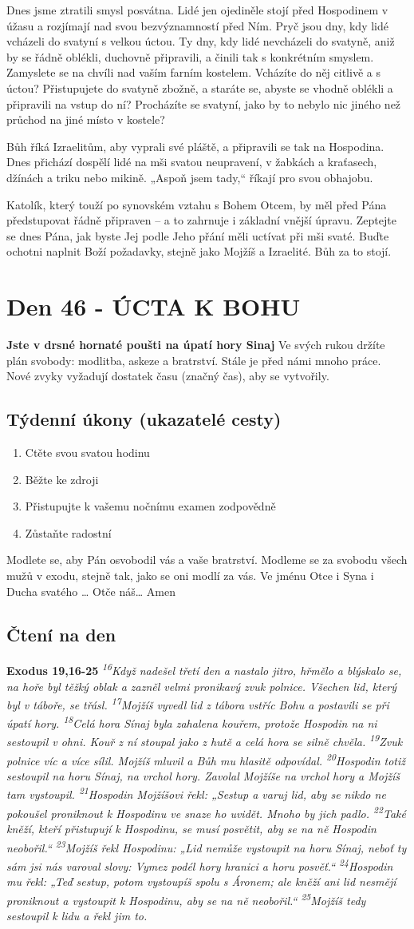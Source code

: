 \documentclass[11pt]{article}
\newcommand{\zacatekSedmyTyden}{
  \textbf{Jste v drsné hornaté poušti na úpatí hory Sinaj} \newline 
  Ve svých rukou držíte plán svobody: modlitba, askeze a bratrství. Stále je před námi mnoho práce. Nové zvyky vyžadují dostatek času (značný čas), aby se vytvořily.

  \subsection*{Týdenní úkony (ukazatelé cesty)}
\begin{enumerate}
  \item Ctěte svou svatou hodinu
  \item Běžte ke zdroji
  \item Přistupujte k vašemu nočnímu examen zodpovědně
  \item Zůstaňte radostní
\end{enumerate}
Modlete se, aby Pán osvobodil vás a vaše bratrství. \newline
Modleme se za svobodu všech mužů v exodu, stejně tak, jako se oni modlí za vás.\newline
Ve jménu Otce i Syna i Ducha svatého …  Otče náš… Amen
}
\begin{document}
Dnes jsme ztratili smysl posvátna. Lidé jen ojediněle stojí před Hospodinem v úžasu a rozjímají nad svou
bezvýznamností před Ním. Pryč jsou dny, kdy lidé vcházeli do svatyní s velkou úctou. Ty dny, kdy lidé nevcházeli do
svatyně, aniž by se řádně oblékli, duchovně připravili, a činili tak s konkrétním smyslem. Zamyslete se na chvíli nad
vaším farním kostelem. Vcházíte do něj citlivě a s úctou? Přistupujete do svatyně zbožně, a staráte se, abyste se vhodně
oblékli a připravili na vstup do ní? Procházíte se svatyní, jako by to nebylo nic jiného než průchod na jiné místo v kostele?

Bůh říká Izraelitům, aby vyprali své pláště, a připravili se tak na Hospodina. Dnes přichází dospělí lidé na mši svatou
neupravení, v žabkách a kraťasech, džínách a triku nebo mikině. „Aspoň jsem tady,“ říkají pro svou obhajobu.

Katolík, který touží po synovském vztahu s Bohem Otcem, by měl před Pána předstupovat řádně připraven – a to zahrnuje
i základní vnější úpravu. Zeptejte se dnes Pána, jak byste Jej podle Jeho přání měli uctívat při mši svaté. Buďte ochotni
naplnit Boží požadavky, stejně jako Mojžíš a Izraelité. Bůh za to stojí.


\newpage
\section{Den 46 - ÚCTA K BOHU}
\zacatekSedmyTyden
\subsection*{Čtení na den}
\textbf{Exodus 19,16-25}
\newline
\textit{
\textsuperscript{16}Když nadešel třetí den a nastalo jitro, hřmělo a blýskalo se, na hoře byl těžký oblak a zazněl velmi pronikavý zvuk polnice. Všechen lid, který byl v táboře, se třásl.
\textsuperscript{17}Mojžíš vyvedl lid z tábora vstříc Bohu a postavili se při úpatí hory.
\textsuperscript{18}Celá hora Sínaj byla zahalena kouřem, protože Hospodin na ni sestoupil v ohni. Kouř z ní stoupal jako z hutě a celá hora se silně chvěla.
\textsuperscript{19}Zvuk polnice víc a více sílil. Mojžíš mluvil a Bůh mu hlasitě odpovídal.
\textsuperscript{20}Hospodin totiž sestoupil na horu Sínaj, na vrchol hory. Zavolal Mojžíše na vrchol hory a Mojžíš tam vystoupil.
\textsuperscript{21}Hospodin Mojžíšovi řekl: „Sestup a varuj lid, aby se nikdo ne pokoušel proniknout k Hospodinu ve snaze ho uvidět. Mnoho by jich padlo.
\textsuperscript{22}Také kněží, kteří přistupují k Hospodinu, se musí posvětit, aby se na ně Hospodin neobořil.“
\textsuperscript{23}Mojžíš řekl Hospodinu: „Lid nemůže vystoupit na horu Sínaj, neboť ty sám jsi nás varoval slovy: Vymez podél hory hranici a horu posvěť.“
\textsuperscript{24}Hospodin mu řekl: „Teď sestup, potom vystoupíš spolu s Áronem; ale kněží ani lid nesmějí proniknout a vystoupit k Hospodinu, aby se na ně neobořil.“
\textsuperscript{25}Mojžíš tedy sestoupil k lidu a řekl jim to.
}
\end{document}
